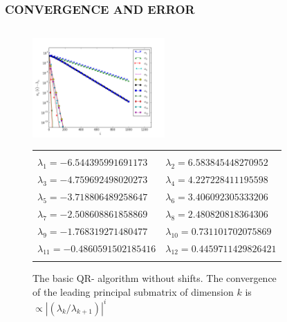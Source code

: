 \documentclass[a4paper,8pt]{beamer} %
\begin{document}
\begin{frame} %
\frametitle{CONVERGENCE AND ERROR}
\begin{columns}%
\column{6cm}
\begin{figure}%
\begin{center}
\includegraphics[height=3.8cm]{12x12randn_eigv_conv_QRstandard.png}
	\begin{scriptsize}
	\begin{tabular}{ll}
		\hline
		\hline
		\\
		$\lambda_1=
		-6.544395991691173
		$ & $\lambda_2=
		6.583845448270952
		$ \\ $\lambda_3=
		-4.759692498020273
		$ & $\lambda_4=
		4.227228411195598
		$ \\ $\lambda_5=
		-3.718806489258647
		$ & $\lambda_6=
		3.406092305333206
		$ \\ $\lambda_7=
		-2.508608861858869
		$ & $\lambda_8=
		2.480820818364306
		$ \\ $\lambda_9=
		-1.768319271480477
		$ & $\lambda_{10}=
		0.731101702075869
		$ \\ $\lambda_{11}=
		-0.4860591502185416
		$ & $\lambda_{12}=
		0.4459711429826421
		$ \\
		\\
		\hline
		\hline
	\end{tabular}
	\end{scriptsize}
\caption{
	The basic QR- algorithm without shifts. The convergence of the leading principal submatrix
	of dimension $k$ is $\propto |(\lambda_k/\lambda_{k+1})|^i$
}
\end{center}
\end{figure}
%
%
%
\column{6cm}
%
\begin{figure}
\begin{center}
\includegraphics[height=3.8cm]{12x12randn_eigv_conv_QRfull.png}

\end{center}
\end{figure}
\end{columns}
\end{frame}
\end{document}
